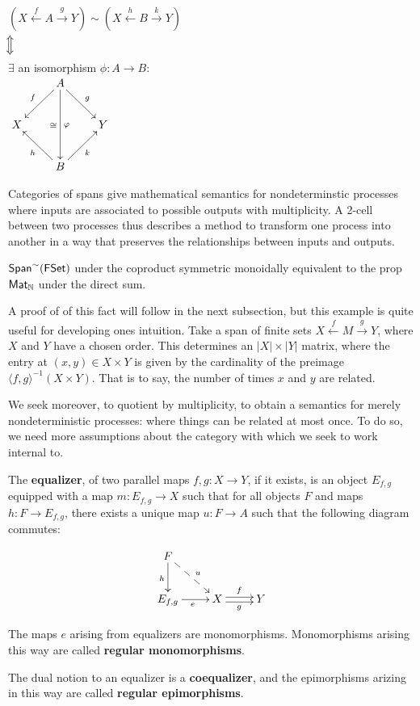 \begin{definition}
\begin{centering}
$(X\xleftarrow{f} A \xrightarrow{g} Y)
 \sim
(X\xleftarrow{h} B \xrightarrow{k} Y)$\\
$\text{\rotatebox{90}{$\iff$}}$\\
$\exists$  an isomorphism $\phi:A\to B$: \\
\hfil$\xymatrix{
    & A \ar[dl]_{f} \ar[dr]^{g} \ar[dd]^{\phi}_{\cong}
    &
  \\X 
    &
    & Y
  \\
    & B \ar[ul]^{h} \ar[ur]_{k}
    &
}$
\end{centering}

\end{definition}


Categories of spans give mathematical semantics for nondeterminstic processes where inputs are associated to possible outputs with multiplicity. 
A 2-cell between two processes thus describes a method to transform one process into another in a way that preserves the relationships between inputs and outputs.



\begin{example}{\cite{????}}
$\mathsf{Span}^\sim(\mathsf{FSet})$ under the coproduct symmetric monoidally equivalent to the prop $\mathsf{Mat}_{\mathbb{N}}$ under the direct sum. 
\end{example}

A proof of of this fact will follow in the next subsection, but this example is quite useful for developing ones intuition.  Take a span of finite sets $X\xleftarrow{f} M \xrightarrow{g} Y$, where $X$ and $Y$ have a chosen order. This determines an $|X|\times |Y|$ matrix, where the entry at $(x,y)\in X\times Y$ is given by the cardinality of the preimage $\langle f,g\rangle^{-1}(X\times Y)$.  That is to say, the number of times $x$ and $y$ are related.



We seek moreover, to quotient by multiplicity, to obtain a semantics for merely nondeterministic processes: where things can be related at most once.  To do so, we need more assumptions about the category with which we seek to work internal to.


\begin{definition}
The {\bf equalizer}, of two parallel maps $f,g:X\to Y$, if it exists, is an object $E_{f,g}$ equipped with a map $m:E_{f,g}\to X$ such that for all objects $F$ and maps $h:F\to E_{f,g}$, there exists a unique map $u:F\to A$ such that the following diagram commutes:

$$
\xymatrix{
    F \ar@{-->}[dr]^{u} \ar[d]_h
  \\ E_{f,g} \ar[r]_e
    & X \ar@<-.5ex>[r]_g \ar@<.5ex>[r]^f
    & Y
}
$$

The maps $e$ arising from equalizers are monomorphisms.  Monomorphisms arising this way are called {\bf regular monomorphisms}.


The dual notion to an equalizer is a {\bf coequalizer}, and the epimorphisms arizing in this way are called {\bf regular epimorphisms}.
\end{definition}




